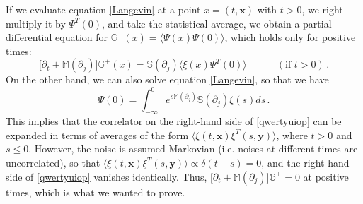 \documentclass[a4paper, amsfonts, amssymb, amsmath, reprint, showkeys, nofootinbib, twoside,notitlepage,onecolumn]{revtex4-2}
\newcommand{\spc}{\quad \quad \quad}
\newcommand{\Ma}{{\mathbb{M}}}
\newcommand{\Sa}{{\mathbb{S}}}
\newcommand{\Ga}{{\mathbb{G}}}
\newcommand{\Ka}{{\mathbb{K}}}
\newcommand{\x}{{\textbf{x}}}
\theoremstyle{definition}
\begin{document}
If we evaluate equation \eqref{Langevin} at a point $x=(t,\x)$ with $t>0$, we right-multiply it by $\Psi^T(0)$, and take the statistical average, we obtain a partial differential equation for $\Ga^+(x)=\langle \Psi(x)\Psi(0)\rangle$, which holds only for positive times:
\begin{equation}\label{qwertyuiop}
    \big[\partial_t +\Ma(\partial_j)\big] \Ga^+(x) = \Sa(\partial_j)\langle \xi(x)\Psi^T(0)\rangle  \spc (\text{if }t>0) \, .
\end{equation}
On the other hand, we can also solve equation \eqref{Langevin}, so that we have
\begin{equation}
    \Psi(0)= \int_{-\infty}^0 e^{s\Ma(\partial_j)} \Sa(\partial_j)\xi(s) ds \, .
\end{equation}
This implies that the correlator on the right-hand side of \eqref{qwertyuiop} can be expanded in terms of averages of the form $\langle \xi(t,\textbf{x})\xi^T(s,\textbf{y})\rangle$, where $t>0$ and $s \leq 0$. However, the noise is assumed Markovian (i.e. noises at different times are uncorrelated), so that $\langle \xi(t,\textbf{x})\xi^T(s,\textbf{y})\rangle \propto \delta(t{-}s)=0$, and the right-hand side of \eqref{qwertyuiop} vanishes identically. Thus, $\big[\partial_t +\Ma(\partial_j)\big] \Ga^+=0$ at positive times, which is what we wanted to prove. 


\end{document}
